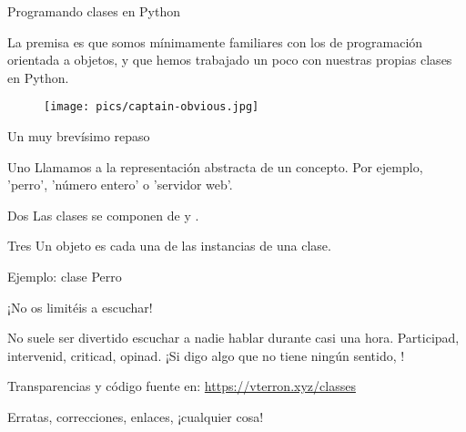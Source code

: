 \begin{frame}{Programando clases en Python}
  \begin{alertblock}{}
    \small
    \centering
    La premisa es que somos mínimamente familiares con los
     de programación orientada a objetos,
    y que hemos trabajado un poco con nuestras propias clases en
    Python.
  \end{alertblock}

  \begin{figure}
    \centering
    \texttt{[image: pics/captain-obvious.jpg]}
  \end{figure}
\end{frame}

\begin{frame}{Un muy brevísimo repaso}
  \small
  \begin{block}{\centering Uno}
    \centering
    Llamamos  a la representación abstracta de un
    concepto. Por ejemplo, 'perro', 'número entero' o 'servidor web'.
  \end{block}

  \begin{block}{\centering Dos}
    \centering
    Las clases se componen de  y
    .
  \end{block}

  \begin{block}{\centering Tres}
    \centering
    Un objeto es cada una de las instancias de una clase.
  \end{block}
\end{frame}

\begin{frame}{Ejemplo: clase Perro}
\end{frame}

\begin{frame}{¡No os limitéis a escuchar!}
  \begin{center}
    No suele ser divertido escuchar a nadie hablar durante casi una
    hora. Participad, intervenid, criticad, opinad. ¡Si digo algo que
    no tiene ningún sentido, !
  \end{center}

  \begin{block}{\centering Transparencias y código fuente en:}
    \centering \url{https://vterron.xyz/classes}
  \end{block}

  \begin{center}
    \small Erratas, correcciones, enlaces, ¡cualquier cosa!
  \end{center}
\end{frame}
